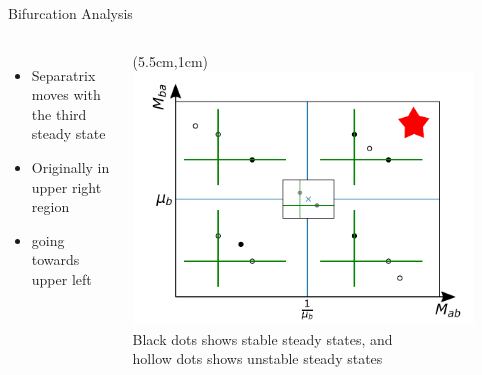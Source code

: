 \documentclass[15pt]{beamer}
\begin{document}
\begin{frame}{Bifurcation Analysis}
\begin{columns}
\begin{itemize}
	\item Separatrix moves with the third steady state
	\item Originally in upper right region
	\item going towards upper left
\end{itemize}
	\begin{textblock*}{7.6cm}(5.5cm,1cm) %
	 \includegraphics[width=0.9\textwidth]{bifurcation}
	 {\small
	  Black dots shows stable steady states, and \\hollow dots shows unstable steady states}
	\end{textblock*}
\end{columns}
\end{frame}
\end{document}
